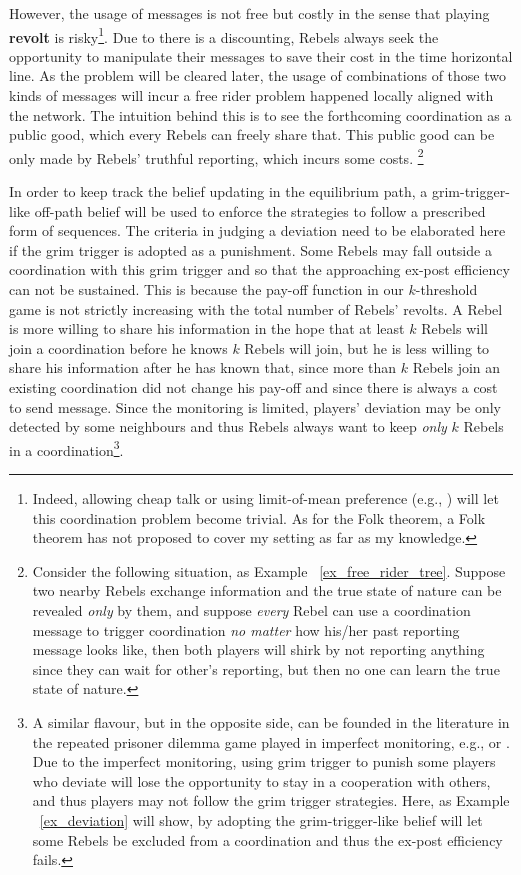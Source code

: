 \documentclass[12pt,letter]{article}
\theoremstyle{definition}
\theoremstyle{remark}
\theoremstyle{claim}
\begin{document}
However, the usage of messages is not free but costly in the sense that playing \textbf{revolt} is risky\footnote{Indeed, allowing cheap talk or using limit-of-mean preference (e.g., \citep{Renault1998}) will let this coordination problem become trivial. As for the Folk theorem, a Folk theorem has not proposed to cover my setting as far as my knowledge. }. Due to there is a discounting, Rebels always seek the opportunity to manipulate their messages to save their cost in the time horizontal line. As the problem will be cleared later, the usage of combinations of those two kinds of messages will incur a free rider problem happened locally aligned with the network. The intuition behind this is to see the forthcoming coordination as a public good, which every Rebels can freely share that. This public good can be only made by Rebels' truthful reporting, which incurs some costs. \footnote{Consider the following situation, as Example ~\ref{ex_free_rider_tree}. Suppose two nearby Rebels exchange information and the true state of nature can be revealed \textit{only} by them, and suppose \textit{every} Rebel can use a coordination message to trigger coordination \textit{no matter} how his/her past reporting message looks like, then both players will shirk by not reporting anything since they can wait for other's reporting, but then no one can learn the true state of nature.}

In order to keep track the belief updating in the equilibrium path, a grim-trigger-like off-path belief will be used to enforce the strategies to follow a prescribed form of sequences. The criteria in judging a deviation need to be elaborated here if the grim trigger is adopted as a punishment. Some Rebels may fall outside a coordination with this grim trigger and so that the approaching ex-post efficiency can not be sustained. This is because the pay-off function in our $k$-threshold game is not strictly increasing with the total number of Rebels' revolts. A Rebel is more willing to share his information in the hope that at least $k$ Rebels will join a coordination before he knows $k$ Rebels will join, but he is less willing to share his information after he has known that, since more than $k$ Rebels join an existing coordination did not change his pay-off and since there is always a cost to send message. Since the monitoring is limited, players' deviation may be only detected by some neighbours and thus Rebels always want to keep \textit{only} $k$ Rebels in a coordination\footnote{A similar flavour, but in the opposite side, can be founded in the literature in the repeated prisoner dilemma game played in imperfect monitoring, e.g., \citep{Ellison1994} or \citep{Wolitzky2013}. Due to the imperfect monitoring, using grim trigger to punish some players who deviate will lose the opportunity to stay in a cooperation with others, and thus players may not follow the grim trigger strategies. Here, as Example ~\ref{ex_deviation} will show, by adopting the grim-trigger-like belief will let some Rebels be excluded from a coordination and thus the ex-post efficiency fails.}. 
\end{document}
